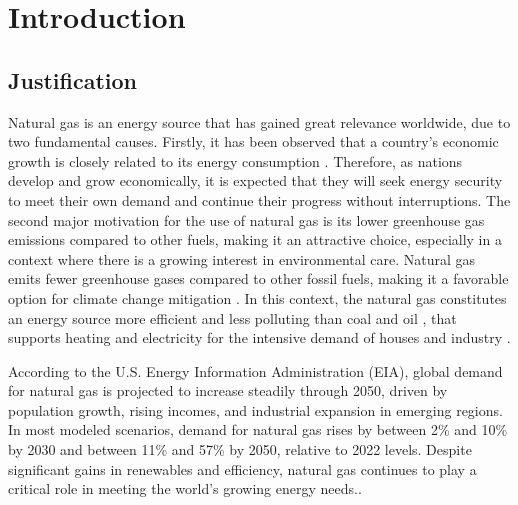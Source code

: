 \chapter{Introduction} \label{cap:introduccion}

\section{Justification}

Natural gas is an energy source that has gained great relevance worldwide, due to two fundamental causes. Firstly, it has been observed that a country's economic growth is closely related to its energy consumption \cite{Alam_M}. Therefore, as nations develop and grow economically, it is expected that they will seek energy security to meet their own demand and continue their progress without interruptions. The second major motivation for the use of natural gas is its lower greenhouse gas emissions compared to other fuels, making it an attractive choice, especially in a context where there is a growing interest in environmental care. Natural gas emits fewer greenhouse gases compared to other fossil fuels, making it a favorable option for climate change mitigation \cite{china_natural_gas}. In this context, the natural gas constitutes an energy source more efficient and less polluting than coal and oil \cite{Yin_Wen_Wu_Han_Mukhtar_Gong_2022}, that supports heating and electricity for the intensive demand of houses and industry \cite{Aydin_2018}.


According to the U.S. Energy Information Administration (EIA), global demand for natural gas is projected to increase steadily through 2050, driven by population growth, rising incomes, and industrial expansion in emerging regions. In most modeled scenarios, demand for natural gas rises by between 2\% and 10\% by 2030 and between 11\% and 57\% by 2050, relative to 2022 levels. Despite significant gains in renewables and efficiency, natural gas continues to play a critical role in meeting the world's growing energy needs.\cite{IEA_2024}. 


